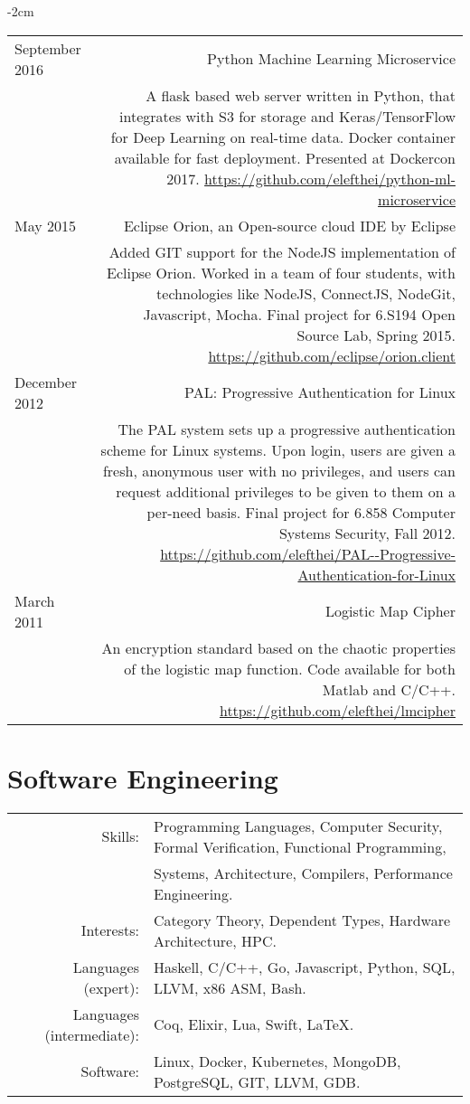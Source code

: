 \documentclass[lettersize,10pt]{article}
\begin{document}
\begin{adjustwidth}{}{-2cm}
\begin{tabularx}{\textwidth}{L R}
    September 2016 & {\sc Python Machine Learning Microservice} \\
    & A flask based web server written in Python, that integrates with S3 for storage and Keras/TensorFlow for Deep Learning on real-time data.
    Docker container available for fast deployment. Presented at Dockercon 2017. \url{https://github.com/elefthei/python-ml-microservice} \\

    May 2015 & {\sc Eclipse Orion, an Open-source cloud IDE by Eclipse} \\
    & Added GIT support for the NodeJS implementation of Eclipse Orion. Worked in a team of four students, with technologies like NodeJS,
    ConnectJS, NodeGit, Javascript, Mocha. Final project for 6.S194 Open Source Lab, Spring 2015.
    \url{https://github.com/eclipse/orion.client} \\

    December 2012 & {\sc PAL: Progressive Authentication for Linux} \\
    & The PAL system sets up a progressive authentication scheme for Linux systems. Upon login, users are given a fresh, anonymous user
    with no privileges, and users can request additional privileges to be given to them on a per-need basis. Final project for 6.858 Computer
    Systems Security, Fall 2012. \url{https://github.com/elefthei/PAL--Progressive-Authentication-for-Linux} \\

    March 2011 & {\sc Logistic Map Cipher} \\
    & An encryption standard based on the chaotic properties of the logistic map
    function. Code available for both Matlab and C/C++. \url{https://github.com/elefthei/lmcipher} \\

  \end{tabularx}
\end{adjustwidth}

\section{Software Engineering}
\begin{tabular}{rl}
Skills:& Programming Languages, Computer Security, Formal Verification, Functional Programming, \\
	   & Systems, Architecture, Compilers, Performance Engineering. \\
Interests:& Category Theory, Dependent Types, Hardware Architecture, HPC. \\
Languages (expert):& Haskell, C/C++, Go, Javascript, Python, SQL, LLVM, x86 ASM, Bash. \\
Languages (intermediate):& Coq, Elixir, Lua, Swift, \LaTeX. \\
Software:& Linux, Docker, Kubernetes, MongoDB, PostgreSQL, GIT, LLVM, GDB. \\
\end{tabular}
\end{document}
